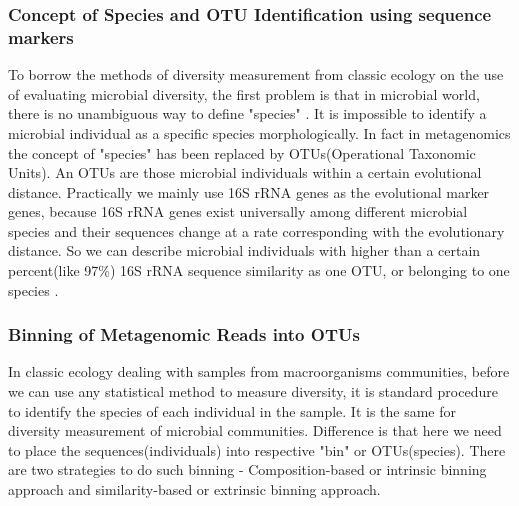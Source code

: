 \subsubsection{Concept of Species and OTU Identification using sequence markers}
To borrow the methods of diversity measurement from classic ecology on the use of evaluating
microbial diversity, the first problem is that in microbial world, there is no unambiguous way to define 
"species" \cite{Stackebrandt:2002aa}. It is impossible to identify a microbial individual as a specific species morphologically.
In fact in metagenomics the concept of "species" has been replaced by OTUs(Operational Taxonomic Units). An OTUs are those 
microbial individuals within a certain evolutional distance. Practically we mainly use 16S rRNA genes as the evolutional marker genes, 
because 16S rRNA genes exist universally among different microbial species and their sequences change at a rate corresponding with
the evolutionary distance.  So we can describe microbial individuals with higher than a certain percent(like 97\%) 16S rRNA
 sequence similarity as one OTU, or belonging to one species \cite{Schloss:2005aa}.
 

\subsubsection{Binning of Metagenomic Reads into OTUs}

In classic ecology dealing with samples from macroorganisms communities, before we can
 use any statistical method to measure diversity, it is standard procedure to identify 
 the species of each individual in the sample. It is the same for diversity measurement of 
 microbial communities. Difference is that here we need to place the sequences(individuals) into respective
 "bin" or OTUs(species). There are two strategies to do such binning - Composition-based or intrinsic binning approach 
 and similarity-based or extrinsic binning approach.
 
